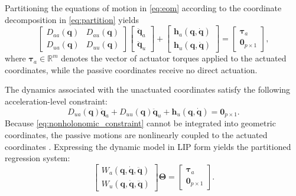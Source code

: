 \documentclass[lettersize,journal]{IEEEtran}
\begin{document}
Partitioning the equations of motion in \eqref{eq:eom} according to the coordinate decomposition in \eqref{eq:partition} yields
\begin{equation}
	\begin{bmatrix}
		D_{aa}(\bm{q}) & D_{au}(\bm{q}) \\
		D_{ua}(\bm{q}) & D_{uu}(\bm{q})
	\end{bmatrix}
	\begin{bmatrix}
		\ddot{\bm{q}}_a \\
		\ddot{\bm{q}}_u
	\end{bmatrix}
	+
	\begin{bmatrix}
		\bm{h}_a(\bm{q},\dot{\bm{q}}) \\
		\bm{h}_u(\bm{q},\dot{\bm{q}})
	\end{bmatrix}
	=
	\begin{bmatrix}
		\bm{\tau}_a \\
		\mathbf{0}_{p\times1}
	\end{bmatrix},
	\label{eq:partitioned_eom}
\end{equation}
where $\bm{\tau}_a \in \mathbb{R}^{m}$ denotes the vector of actuator torques applied to the actuated coordinates, while the passive coordinates receive no direct actuation.

The dynamics associated with the unactuated coordinates satisfy the following acceleration-level constraint: 
\begin{equation}
    D_{ua}(\bm{q})\ddot{\bm{q}}_a + D_{uu}(\bm{q})\ddot{\bm{q}}_u + \bm{h}_u(\bm{q}, \dot{\bm{q}}) = \mathbf{0}_{p \times 1}.
    \label{eq:nonholonomic_constraint}
\end{equation}
Because \eqref{eq:nonholonomic_constraint} cannot be integrated into geometric coordinates, the passive motions are nonlinearly coupled to the actuated coordinates \cite{Fantoni2002}. Expressing the dynamic model in LIP form yields the partitioned regression system:
\begin{equation}
    \begin{bmatrix} W_a(\bm{q}, \dot{\bm{q}}, \ddot{\bm{q}}) \\ W_u(\bm{q}, \dot{\bm{q}}, \ddot{\bm{q}}) \end{bmatrix} \bm{\Theta} = \begin{bmatrix} \bm{\tau}_a \\ \mathbf{0}_{p \times 1} \end{bmatrix}.
    \label{eq:partitioned_regressor}
\end{equation}
\end{document}
